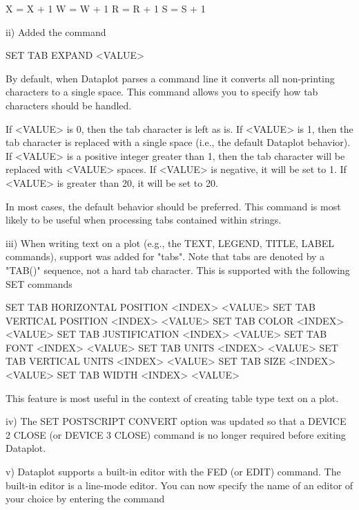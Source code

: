             X = X + 1
             W = W + 1
             R = R + 1
             S = S + 1

     ii) Added the command

            SET TAB EXPAND <VALUE>

         By default, when Dataplot parses a command line it converts
         all non-printing characters to a single space.  This command
         allows you to specify how tab characters should be handled.

         If <VALUE> is 0, then the tab character is left as is.
         If <VALUE> is 1, then the tab character is replaced with
         a single space (i.e., the default Dataplot behavior).  If
         <VALUE> is a positive integer greater than 1, then the tab
         character will be replaced with <VALUE> spaces.  If <VALUE>
         is negative, it will be set to 1.  If <VALUE> is greater than
         20, it will be set to 20.

         In most cases, the default behavior should be preferred.  This
         command is most likely to be useful when processing tabs
         contained within strings.

    iii) When writing text on a plot (e.g., the TEXT, LEGEND, TITLE,
         LABEL commands), support was added for "tabs".  Note that
         tabs are denoted by a "TAB()" sequence, not a hard tab
         character.  This is supported with the following SET commands

            SET TAB HORIZONTAL POSITION  <INDEX> <VALUE>
            SET TAB VERTICAL   POSITION  <INDEX> <VALUE>
            SET TAB COLOR                <INDEX> <VALUE>
            SET TAB JUSTIFICATION        <INDEX> <VALUE>
            SET TAB FONT                 <INDEX> <VALUE>
            SET TAB UNITS                <INDEX> <VALUE>
            SET TAB VERTICAL UNITS       <INDEX> <VALUE>
            SET TAB SIZE                 <INDEX> <VALUE>
            SET TAB WIDTH                <INDEX> <VALUE>

         This feature is most useful in the context of creating
         table type text on a plot.

     iv) The SET POSTSCRIPT CONVERT option was updated so that a
         DEVICE 2 CLOSE (or DEVICE 3 CLOSE) command is no longer required
         before exiting Dataplot.

      v) Dataplot supports a built-in editor with the FED (or EDIT)
         command.  The built-in editor is a line-mode editor.  You can
         now specify the name of an editor of your choice by entering
         the command

